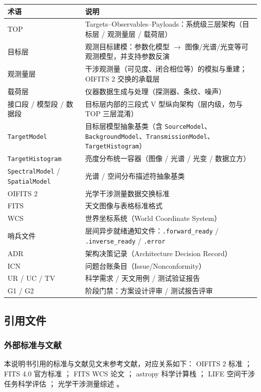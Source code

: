 \begin{longtable}{>{\raggedright\arraybackslash}p{3.4cm}p{11.5cm}}
\toprule
术语 & 说明 \\
\midrule
\endhead
TOP & Targets--Observables--Payloads：系统级三层架构（目标层 / 观测量层 / 载荷层） \\
目标层 & 观测目标建模：参数化模型 $\rightarrow$ 图像/光谱/光变等可观测模型，并支持参数反演 \\
观测量层 & 干涉观测量（可见度、闭合相位等）的模拟与重建；OIFITS 2 交换的承载层 \\
载荷层 & 仪器数据生成与处理（探测器、条纹、噪声） \\
接口段 / 模型段 / 数据段 & 目标层内部的三段式 V 型纵向架构（层内级，勿与 TOP 三层混淆） \\
\texttt{TargetModel} & 目标层模型抽象基类（含 \texttt{SourceModel}、\texttt{BackgroundModel}、\texttt{TransmissionModel}、\texttt{TargetHistogram}） \\
\texttt{TargetHistogram} & 亮度分布统一容器（图像 / 光谱 / 光变 / 数据立方） \\
\texttt{SpectralModel} / \texttt{SpatialModel} & 光谱 / 空间分布描述符抽象基类 \\
OIFITS 2 & 光学干涉测量数据交换标准 \cite{duvert2017oifits} \\
FITS & 天文图像与表格标准格式 \cite{fits_standard40} \\
WCS & 世界坐标系统（World Coordinate System） \cite{greisen2002wcs} \\
哨兵文件 & 层间异步就绪通知文件：\texttt{.forward\_ready} / \texttt{.inverse\_ready} / \texttt{.error} \\
ADR & 架构决策记录（Architecture Decision Record） \\
ICN & 问题台账条目（Issue/Nonconformity） \\
UR / UC / TV & 科学需求 / 天文用例 / 测试验证报告 \\
G1 / G2 & 阶段门禁：方案设计评审 / 测试报告评审 \\
\bottomrule
\end{longtable}

\subsection{引用文件}

\subsubsection{外部标准与文献}
本说明书引用的标准与文献见文末参考文献，对应关系如下：
OIFITS 2 标准 \cite{duvert2017oifits}；
FITS 4.0 官方标准 \cite{fits_standard40}；
FITS WCS 论文 \cite{greisen2002wcs}；
astropy 科学计算栈 \cite{astropy2022}；
LIFE 空间干涉任务科学评估 \cite{quanz2022life}；
光学干涉测量综述 \cite{monnier2003optical, eisenhauer2023advances}。

